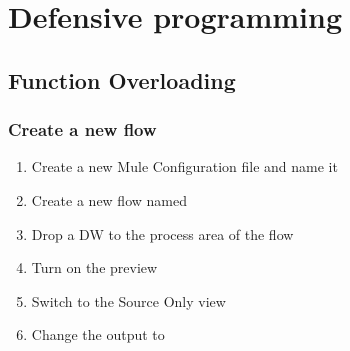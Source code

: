 \chapter{Defensive programming}

\section{Function Overloading}

\subsection{Create a new flow}
\begin{enumerate}
\item Create a new Mule Configuration file and name it 
\item Create a new flow named 
\item Drop a DW to the process area of the flow
\item Turn on the preview
\item Switch to the Source Only view
\item Change the output to 
\end{enumerate}

